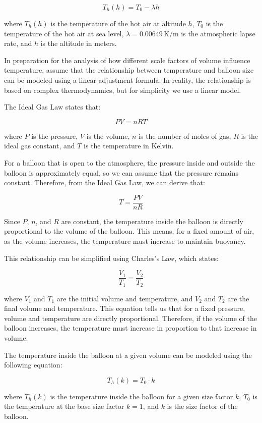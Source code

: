 \documentclass{article}
\begin{document}
\[
T_h(h) = T_0 - \lambda h
\]

where \( T_h(h) \) is the temperature of the hot air at altitude \( h \), \( T_0 \) is the temperature of the hot air at sea level,
\( \lambda = 0.00649 \, \text{K/m} \) is the atmospheric lapse rate, and \( h \) is the altitude in meters.

In preparation for the analysis of how different scale factors of volume influence temperature, assume that the relationship between temperature and balloon size can be modeled using a linear adjustment formula. In reality, the relationship is based on complex thermodynamics, but for simplicity we use a linear model.

The Ideal Gas Law states that:

\[
PV = nRT
\]

where \( P \) is the pressure, \( V \) is the volume, \( n \) is the number of moles of gas, \( R \) is the ideal gas constant, and \( T \) is the temperature in Kelvin.

For a balloon that is open to the atmosphere, the pressure inside and outside the balloon is approximately equal, so we can assume that the pressure remains constant. Therefore, from the Ideal Gas Law, we can derive that:

\[
T = \frac{PV}{nR}
\]

Since \( P \), \( n \), and \( R \) are constant, the temperature inside the balloon is directly proportional to the volume of the balloon. This means, for a fixed amount of air, as the volume increases, the temperature must increase to maintain buoyancy.

This relationship can be simplified using Charles’s Law, which states:

\[
\frac{V_1}{T_1} = \frac{V_2}{T_2}
\]

where \( V_1 \) and \( T_1 \) are the initial volume and temperature, and \( V_2 \) and \( T_2 \) are the final volume and temperature. This equation tells us that for a fixed pressure, volume and temperature are directly proportional. Therefore, if the volume of the balloon increases, the temperature must increase in proportion to that increase in volume.



The temperature inside the balloon at a given volume can be modeled using the following equation:

\[
T_h(k) = T_0 \cdot k
\]

where \( T_h(k) \) is the temperature inside the balloon for a given size factor \( k \), \( T_0 \) is the temperature at the base size factor \( k = 1 \), and \( k \) is the size factor of the balloon.
\end{document}
